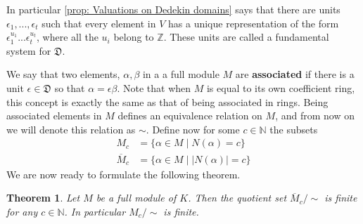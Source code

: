 \documentclass{article}
\newtheorem{theorem}{Theorem}[section]
\newcommand{\mfrak}[1]{\mathfrak{#1}}
\newcommand{\mbb}[1]{\mathbb{#1}}
\begin{document}
In particular \ref{prop: Valuations on Dedekin domains} says that there are units $\epsilon_1, ..., \epsilon_t$ such that every element in $V$ has a unique representation of the form $\epsilon_1^{u_1}...\epsilon_t^{u_t}$, where all the $u_i$ belong to $\mbb Z$. These units are called a fundamental system for $\mfrak D$.  

We say that two elements, $\alpha,\beta$ in a a full module $M$ are \textbf{associated} if there is a unit $\epsilon \in \mfrak D$ so that $\alpha = \epsilon \beta$. Note that when $M$ is equal to its own coefficient ring, this concept is exactly the same as that of being associated in rings. Being associated elements in $M$ defines an equivalence relation on $M$, and from now on we will denote this relation as $\sim$. Define now for some $c \in \mbb N$ the subsets
\begin{align*}
    M_c &= \{ \alpha \in M \mid N(\alpha) = c\} \\
    \overline M_c &= \{ \alpha \in M \mid | N(\alpha) | = c\}
\end{align*}
We are now ready to formulate the following theorem.
\begin{theorem} 
    Let $M$ be a full module of $K$. Then the quotient set $\overline M_c / \sim$ is finite for any $c \in \mbb N$. In particular $M_c / \sim$ is finite.
\end{theorem}
\end{document}
